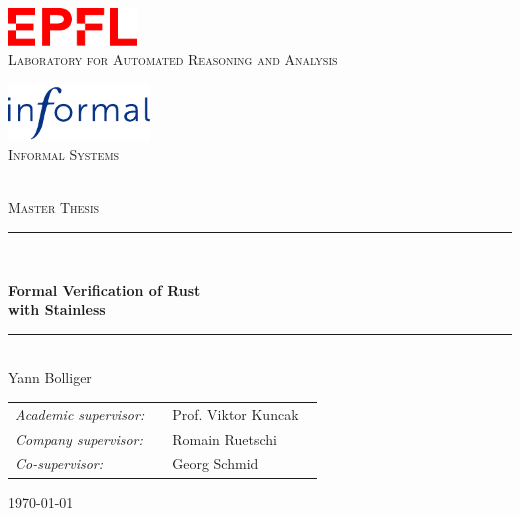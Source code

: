 \thispagestyle{empty}
\begin{center}


\vspace{4cm}
\begin{minipage}[b]{.4\textwidth}
  \begin{center}
    \includegraphics[height=10mm]{img/epfl-logo.pdf}\\
    \vspace*{3mm}
    \textsc{Laboratory for Automated Reasoning and Analysis}
  \end{center}
\end{minipage}
\begin{minipage}[b]{.4\textwidth}
  \begin{center}
    \includegraphics[height=15mm]{img/informal-logo.pdf}\\
    \textsc{Informal Systems}\\~
  \end{center}
\end{minipage}

\vspace{4cm}
{\Large \textsc{Master Thesis}}
\vspace*{1cm}

\rule{.9\linewidth}{.6pt}\\[0.4cm]
{\huge \bfseries Formal Verification of Rust \\ with Stainless \par}\vspace{0.4cm}
\rule{.9\linewidth}{.6pt}\\[1.5cm]

\vspace*{1cm}
{\Large Yann Bolliger}
\vspace*{1cm}

\begin{tabular}{ll}
\textit{Academic supervisor:}   & ~~Prof. Viktor Kuncak \\
\textit{Company supervisor:} & ~~Romain Ruetschi ~~~~ \\
\textit{Co-supervisor:}       & ~~Georg Schmid
\end{tabular}

\vspace*{3cm}
\today\\[4cm] %

\end{center}
\clearpage

